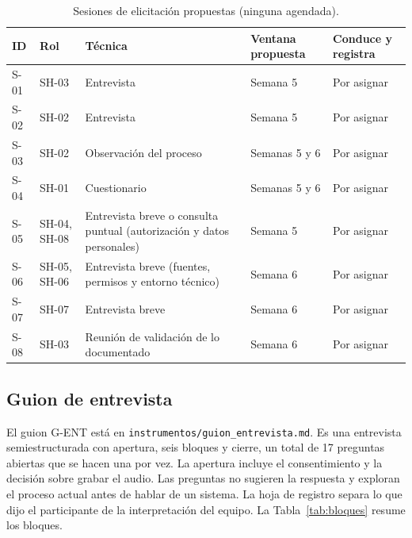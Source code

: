 \documentclass[11pt,a4paper]{article}
\begin{document}
\begin{table}[ht]
\centering
\small
\caption{Sesiones de elicitación propuestas (ninguna agendada).}
\label{tab:sesiones}
\begin{tabularx}{\textwidth}{
    |l
    |l
    |>{\raggedright\arraybackslash}X
    |>{\raggedright\arraybackslash}p{2.4cm}
    |>{\raggedright\arraybackslash}p{2.6cm}|
}
\hline
\textbf{ID} & \textbf{Rol} & \textbf{Técnica} & \textbf{Ventana propuesta} & \textbf{Conduce y registra} \\ \hline
S-01 & SH-03 & Entrevista & Semana 5 & Por asignar \\ \hline
S-02 & SH-02 & Entrevista & Semana 5 & Por asignar \\ \hline
S-03 & SH-02 & Observación del proceso & Semanas 5 y 6 & Por asignar \\ \hline
S-04 & SH-01 & Cuestionario & Semanas 5 y 6 & Por asignar \\ \hline
S-05 & SH-04, SH-08 & Entrevista breve o consulta puntual (autorización y datos personales) & Semana 5 & Por asignar \\ \hline
S-06 & SH-05, SH-06 & Entrevista breve (fuentes, permisos y entorno técnico) & Semana 6 & Por asignar \\ \hline
S-07 & SH-07 & Entrevista breve & Semana 6 & Por asignar \\ \hline
S-08 & SH-03 & Reunión de validación de lo documentado & Semana 6 & Por asignar \\ \hline
\end{tabularx}
\end{table}

\subsection{Guion de entrevista}

El guion G-ENT está en \texttt{instrumentos/\allowbreak guion\_entrevista.md}. Es una entrevista semiestructurada con apertura, seis bloques y cierre, un total de 17 preguntas abiertas que se hacen una por vez. La apertura incluye el consentimiento y la decisión sobre grabar el audio. Las preguntas no sugieren la respuesta y exploran el proceso actual antes de hablar de un sistema. La hoja de registro separa lo que dijo el participante de la interpretación del equipo. La Tabla~\ref{tab:bloques} resume los bloques.
\end{document}
